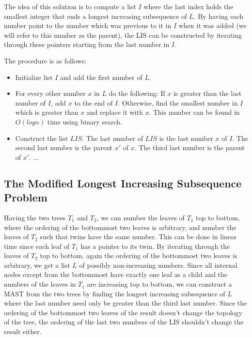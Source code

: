 
The idea of this solution is to compute a list $I$ where the last index holds the smallest integer that ends a longest increasing subsequence of $L$. By having each number point to the number which was previous to it in $I$ when it was added (we will refer to this number as the parent), the LIS can be constructed by iterating through these pointers starting from the last number in $I$.

The procedure is as follows:

\begin{itemize}
	\item Initialize list $I$ and add the first number of $L$.
	\item For every other number $x$ in $L$ do the following:
	\subitem If $x$ is greater than the last number of $I$, add $x$ to the end of $I$.
	\subitem Otherwise, find the smallest number in $I$ which is greater than $x$ and replace it with $x$. This number can be found in $O(logn)$ time using binary search.
	\item Construct the list $LIS$.
	\subitem The last number of $LIS$ is the last number $x$ of $I$.
	\subitem The second last number is the parent $x'$ of $x$.
	\subitem The third last number is the parent of $x'$.
	\subitem ...
\end{itemize}

\subsection{The Modified Longest Increasing Subsequence Problem}
Having the two trees $T_1$ and $T_2$, we can number the leaves of $T_1$ top to bottom, where the ordering of the bottommost two leaves is arbitrary, and number the leaves of $T_2$ such that twins have the same number. This can be done in linear time since each leaf of $T_1$ has a pointer to its twin. By iterating through the leaves of $T_2$ top to bottom, again the ordering of the bottommost two leaves is arbitrary, we get a list $L$ of possibly non-increasing numbers. Since all internal nodes except from the bottommost have exactly one leaf as a child and the numbers of the leaves in $T_1$ are increasing top to bottom, we can construct a MAST from the two trees by finding the longest increasing subsequence of $L$ where the last number need only be greater than the third last number. Since the ordering of the bottommost two leaves of the result doesn't change the topology of the tree, the ordering of the last two numbers of the LIS shouldn't change the result either.

